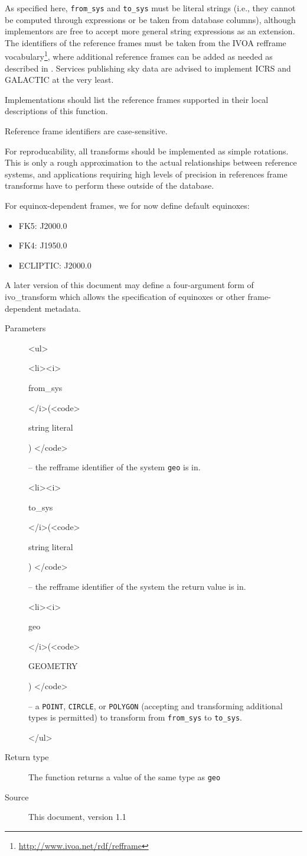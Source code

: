 \documentclass[11pt,a4paper]{ivoa}
\newenvironment{args}%
{\begin{html}<ul>\end{html}\def\arg##1(##2){\begin{html}<li><i>\end{html}%
  ##1 \begin{html}</i>(<code>\end{html}##2\begin{html}) </code>\end{html}}}%
{\begin{html}</ul>\end{html}}
\begin{document}
As specified here, \verb|from_sys| and \verb|to_sys| must be literal
strings (i.e., they cannot be computed through expressions or be taken
from database columns), although implementors are free to accept more
general string expressions as an extension.  The identifiers of the
reference frames must be taken from the IVOA refframe
vocabulary\footnote{\url{http://www.ivoa.net/rdf/refframe}}, where
additional reference frames can be added as needed as described in
\citet{2023ivoa.spec.0206D}.  Services publishing sky data are advised
to implement ICRS and GALACTIC at the very least.

Implementations should list the reference frames supported in their
local descriptions of this function.

Reference frame identifiers are case-sensitive.

For reproducability, all transforms should be implemented as simple
rotations. This is only a rough approximation to the actual
relationships between reference systems, and applications requiring high
levels of precision in references frame transforms have to perform these
outside of the database.

For equinox-dependent frames, we for now define default equinoxes:

\begin{itemize}
\item FK5: J2000.0
\item FK4: J1950.0
\item ECLIPTIC: J2000.0
\end{itemize}

A later version of this document may define a four-argument form of
ivo\_transform which allows the specification of equinoxes or other
frame-dependent metadata.

\begin{description}
\item[Parameters]
\begin{args}
\arg from\_sys (string literal) -- the refframe identifier of the system
\verb|geo| is in.
\arg to\_sys (string literal) -- the refframe identifier of the system
the return value is in.
\arg geo (GEOMETRY) -- a \verb|POINT|, \verb|CIRCLE|, or \verb|POLYGON|
(accepting and transforming additional types is permitted)  to transform
from \verb|from_sys| to \verb|to_sys|.
\end{args}

\item[Return type] The function returns a value of the same type as
\verb|geo|

\item[Source] This document, version 1.1
\end{description}
\end{document}
